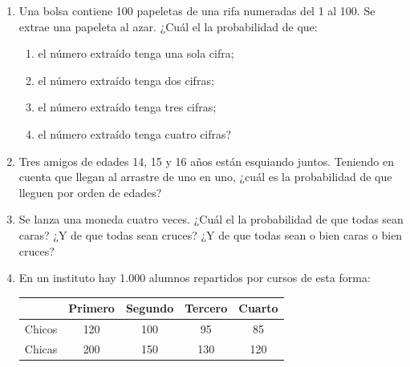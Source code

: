 \documentclass[twoside]{article}
\begin{document}
\begin{enumerate}
\begin{enumerate}
\end{enumerate}
\item Una bolsa contiene 100 papeletas de una rifa numeradas del 1 al 100. Se extrae una papeleta al azar. ¿Cuál el la probabilidad de que:
\begin{enumerate}
\item el número extraído tenga una sola cifra;
\item el número extraído tenga dos cifras;
\item el número extraído tenga tres cifras;
\item el número extraído tenga cuatro cifras?
\end{enumerate}
\item Tres amigos de edades 14, 15 y 16 años están esquiando juntos. Teniendo en cuenta que llegan al arrastre de uno en uno, ¿cuál es la probabilidad de que lleguen por orden de edades?
\item Se lanza una moneda cuatro veces. ¿Cuál el la probabilidad de que todas sean caras? ¿Y de que todas sean cruces? ¿Y de que todas sean o bien caras o bien cruces?
\item En un instituto hay 1.000 alumnos repartidos por cursos de esta forma:

\begin{tabular}{|c|c|c|c|c|}
\hline 
 & Primero & Segundo & Tercero & Cuarto \\ 
\hline 
Chicos & 120 & 100 & 95 & 85 \\ 
\hline 
Chicas & 200 & 150 & 130 & 120 \\ 
\hline 
\end{tabular}


\end{enumerate}
\end{document}
